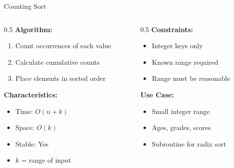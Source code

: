 \documentclass[aspectratio=169,xcolor=dvipsnames]{beamer}
\begin{document}
\begin{frame}{Counting Sort}
  \begin{columns}
    \begin{column}{0.5\textwidth}
      \textbf{Algorithm:}
      \begin{enumerate}
        \item Count occurrences of each value
        \item Calculate cumulative counts
        \item Place elements in sorted order
      \end{enumerate}

      \vspace{0.3cm}
      \textbf{Characteristics:}
      \begin{itemize}
        \item Time: $O(n + k)$
        \item Space: $O(k)$
        \item Stable: Yes
        \item $k$ = range of input
      \end{itemize}
    \end{column}

    \begin{column}{0.5\textwidth}
      \textbf{Constraints:}
      \begin{itemize}
        \item Integer keys only
        \item Known range required
        \item Range must be reasonable
      \end{itemize}

      \vspace{0.3cm}
      \textbf{Use Case:}
      \begin{itemize}
        \item Small integer range
        \item Ages, grades, scores
        \item Subroutine for radix sort
      \end{itemize}
    \end{column}
  \end{columns}
\end{frame}
\end{document}
